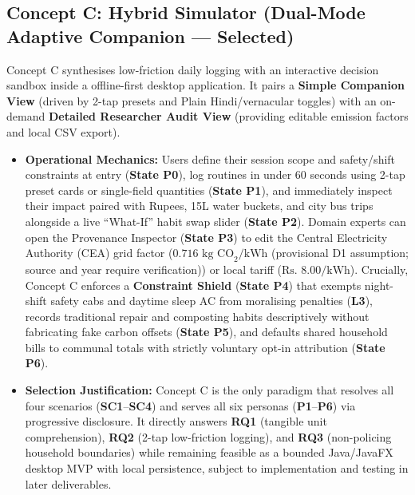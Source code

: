 \documentclass[12pt, a4paper]{article}
\begin{document}
\subsection{Concept C: Hybrid Simulator (Dual-Mode Adaptive Companion --- Selected)}
Concept C synthesises low-friction daily logging with an interactive decision sandbox inside a offline-first desktop application. It pairs a \textbf{Simple Companion View} (driven by 2-tap presets and Plain Hindi/vernacular toggles) with an on-demand \textbf{Detailed Researcher Audit View} (providing editable emission factors and local CSV export).
\begin{itemize}
    \item \textbf{Operational Mechanics:} Users define their session scope and safety/shift constraints at entry (\textbf{State P0}), log routines in under 60 seconds using 2-tap preset cards or single-field quantities (\textbf{State P1}), and immediately inspect their impact paired with Rupees, 15L water buckets, and city bus trips alongside a live ``What-If'' habit swap slider (\textbf{State P2}). Domain experts can open the Provenance Inspector (\textbf{State P3}) to edit the Central Electricity Authority (CEA) grid factor ($0.716\text{ kg CO}_2\text{/kWh}$ (provisional D1 assumption; source and year require verification)) or local tariff ($\text{Rs. }8.00\text{/kWh}$). Crucially, Concept C enforces a \textbf{Constraint Shield} (\textbf{State P4}) that exempts night-shift safety cabs and daytime sleep AC from moralising penalties (\textbf{L3}), records traditional repair and composting habits descriptively without fabricating fake carbon offsets (\textbf{State P5}), and defaults shared household bills to communal totals with strictly voluntary opt-in attribution (\textbf{State P6}).
    \item \textbf{Selection Justification:} Concept C is the only paradigm that resolves all four scenarios (\textbf{SC1}--\textbf{SC4}) and serves all six personas (\textbf{P1}--\textbf{P6}) via progressive disclosure. It directly answers \textbf{RQ1} (tangible unit comprehension), \textbf{RQ2} (2-tap low-friction logging), and \textbf{RQ3} (non-policing household boundaries) while remaining feasible as a bounded Java/JavaFX desktop MVP with local persistence, subject to implementation and testing in later deliverables.
\end{itemize}

\end{document}

